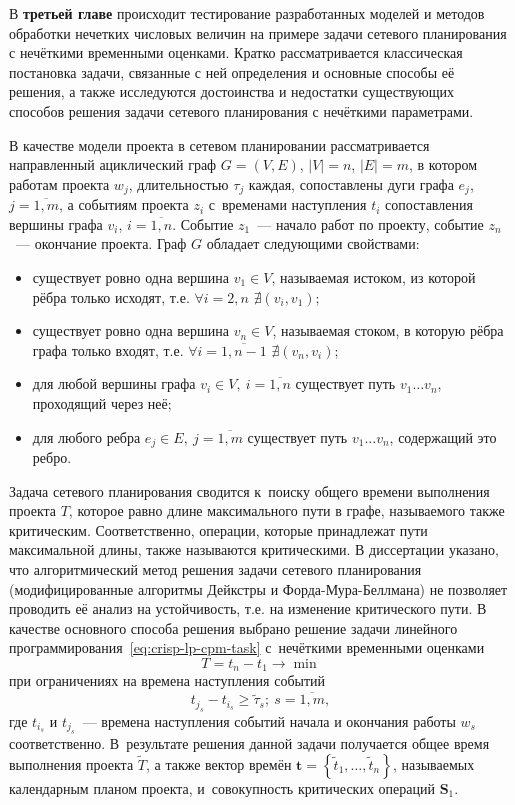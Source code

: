В \textbf{третьей главе} происходит тестирование разработанных моделей и методов обработки нечетких числовых величин на примере задачи сетевого планирования с нечёткими временными оценками. Кратко рассматривается классическая постановка задачи, связанные с ней определения и основные способы её решения, а также исследуются достоинства и недостатки существующих способов решения задачи сетевого планирования с нечёткими параметрами.

В качестве модели проекта в сетевом планировании рассматривается направленный ациклический граф $G=(V,E)$, $\left| V \right|=n$, $\left| E \right|=m$, в котором работам проекта $w_j$, длительностью $\tau_j$ каждая, сопоставлены дуги графа $e_j$, $j=\overline{1,m}$, а событиям проекта $z_i$ с~временами наступления $t_i$ сопоставления вершины графа $v_i$, $i=\overline{1,n}$. Событие $z_1$~--- начало работ по проекту, событие $z_n$~--- окончание проекта. Граф $G$ обладает следующими свойствами:
\begin{itemize}
  \item существует ровно одна вершина $v_1\in V$, называемая истоком, из которой рёбра только исходят, т.е. $\forall i=2,n$ $\nexists \left( v_i, v_1 \right)$;
  \item существует ровно одна вершина $v_n\in V$, называемая стоком, в которую рёбра графа только входят, т.е.  $\forall i=\overline{1,n-1}$ $\nexists \left( v_n, v_i \right)$;
  \item для любой вершины графа $v_i\in V,\ i=\overline{1,n}$ существует путь $v_1\ldots v_n$, проходящий через неё;
  \item для любого ребра $e_j\in E,\ j=\overline{1,m}$ существует путь $v_1\ldots v_n$, содержащий это ребро.
\end{itemize}

Задача сетевого планирования сводится к~поиску общего времени выполнения проекта $T$, которое равно длине максимального пути в графе, называемого также критическим. Соответственно, операции, которые принадлежат пути максимальной длины, также называются критическими. В диссертации указано, что алгоритмический метод решения задачи сетевого планирования (модифицированные алгоритмы Дейкстры и Форда-Мура-Беллмана) не позволяет проводить её анализ на устойчивость, т.е. на изменение критического пути. В качестве основного способа решения выбрано решение задачи линейного программирования~\eqref{eq:crisp-lp-cpm-task} с~нечёткими временными оценками
\begin{equation}
\label{eq:crisp-lp-cpm-task}
  T=t_n-t_1 \to \min
\end{equation}
при ограничениях на времена наступления событий
\begin{equation}
\label{eq:crisp-lp-cpm-restrictions}
  t_{j_s}-t_{i_s}\geqslant \tilde \tau_s;\ s=\overline{1,m},
\end{equation}
где $t_{i_s}$ и $t_{j_s}$~--- времена наступления событий начала и окончания работы $w_s$ соответственно. В~результате решения данной задачи получается общее время выполнения проекта $\tilde T$, а также вектор времён $\mathbf{t}=\left\{\tilde t_1, \ldots, \tilde t_n \right\}$, называемых календарным планом проекта, и~совокупность критических операций $\mathbf{S}_1$.

